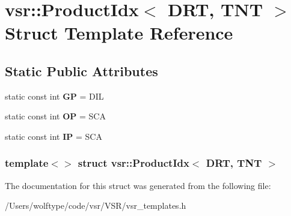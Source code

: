 \hypertarget{structvsr_1_1_product_idx_3_01_d_r_t_00_01_t_n_t_01_4}{\section{vsr\-:\-:Product\-Idx$<$ D\-R\-T, T\-N\-T $>$ Struct Template Reference}
\label{structvsr_1_1_product_idx_3_01_d_r_t_00_01_t_n_t_01_4}
}
\subsection*{Static Public Attributes}
\begin{DoxyCompactItemize}
\item 
\hypertarget{structvsr_1_1_product_idx_3_01_d_r_t_00_01_t_n_t_01_4_a026d6f30d72a186839dedeaef789cd78}{static const int {\bfseries G\-P} = D\-I\-L}\label{structvsr_1_1_product_idx_3_01_d_r_t_00_01_t_n_t_01_4_a026d6f30d72a186839dedeaef789cd78}

\item 
\hypertarget{structvsr_1_1_product_idx_3_01_d_r_t_00_01_t_n_t_01_4_aa41c0a475ee2ad7129c8c28b0d51b645}{static const int {\bfseries O\-P} = S\-C\-A}\label{structvsr_1_1_product_idx_3_01_d_r_t_00_01_t_n_t_01_4_aa41c0a475ee2ad7129c8c28b0d51b645}

\item 
\hypertarget{structvsr_1_1_product_idx_3_01_d_r_t_00_01_t_n_t_01_4_a1bc525973f2a1365cd0964bdd1749b6c}{static const int {\bfseries I\-P} = S\-C\-A}\label{structvsr_1_1_product_idx_3_01_d_r_t_00_01_t_n_t_01_4_a1bc525973f2a1365cd0964bdd1749b6c}

\end{DoxyCompactItemize}
\subsubsection*{template$<$$>$ struct vsr\-::\-Product\-Idx$<$ D\-R\-T, T\-N\-T $>$}



The documentation for this struct was generated from the following file\-:\begin{DoxyCompactItemize}
\item 
/\-Users/wolftype/code/vsr/\-V\-S\-R/vsr\-\_\-templates.\-h\end{DoxyCompactItemize}
